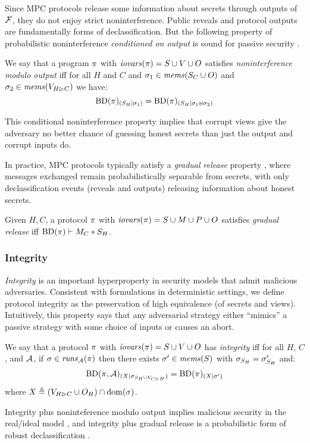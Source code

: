 Since MPC protocols release some information about secrets through
outputs of $\mathcal{F}$, they do not enjoy strict noninterference.
Public reveals and protocol outputs are fundamentally forms of
declassification. But the following property of probabilistic
noninterference \emph{conditioned on output} is sound for passive
security \cite{skalka-near-ppdp24}.
\begin{definition}
  \label{definition-NIMO}
  We say that a program $\pi$ with $\mathit{iovars}(\pi) = S \cup V \cup O$
  satisfies \emph{noninterference modulo output}
  iff for all $H$ and $C$ and $\sigma_1 \in \mathit{mems}(S_C \cup O)$ and $\sigma_2 \in \mathit{mems}(V_{H \rhd C})$
  we have:
  $$
  \mathrm{BD}(\pi)_{({S_H}|{\sigma_1})} = \mathrm{BD}(\pi)_{({S_H}|{\sigma_1 \uplus \sigma_2})}
 $$
\end{definition}
This conditional noninterference property implies that
corrupt views give the adversary no better chance of guessing honest
secrets than just the output and corrupt inputs do.

In practice, MPC protocols typically satisfy a \emph{gradual
release} property \cite{sabelfeld2009declassification}, where messages
exchanged remain probabilistically separable from secrets, with only
declassification events (reveals and outputs) releasing information
about honest secrets.  
\begin{definition}
  Given $H,C$, a protocol $\pi$ with $\mathit{iovars}(\pi) = S \cup M \cup P \cup O$
  satisfies \emph{gradual release} iff
  $\mathrm{BD}(\pi) \vdash M_C * S_H$.
\end{definition}

\subsubsection{Integrity}

\emph{Integrity} is an important hyperproperty in security models that
admit malicious adversaries. Consistent with formulations in
deterministic settings, we define protocol integrity as the
preservation of high equivalence (of secrets and views). Intuitively,
this property says that any adversarial strategy either ``mimics'' a
passive strategy with some choice of inputs or causes an abort.
\begin{definition}[Integrity]
  \label{def-integrity}
  We say that a protocol $\pi$ with $\mathit{iovars}(\pi) = S \cup V \cup O$ has
  \emph{integrity} iff for all $H$, $C$, and $\mathcal{A}$,
  if $\sigma \in \mathit{runs}_{\mathcal{A}}(\pi)$ 
  then there exists $\sigma' \in \mathit{mems}(S)$ with $\sigma_{S_H} = \sigma'_{S_H} $ and:
    $$
    \mathrm{BD}(\pi,\mathcal{A})_{({X}|{\sigma_{S_H \cup V_{C \rhd H}}})} =
    \mathrm{BD}(\pi)_{({X}|{\sigma'})}
    $$ 
  where $X \triangleq (V_{H \rhd C} \cup O_H) \cap \mathrm{dom}(\sigma)$. 
\end{definition}
Integrity plus noninteference modulo output implies malicious security
in the real/ideal model \cite{skalka-near-ppdp24}, and integrity plus
gradual release is a probabilistic form of robust declassification
\cite{sabelfeld2009declassification}.


